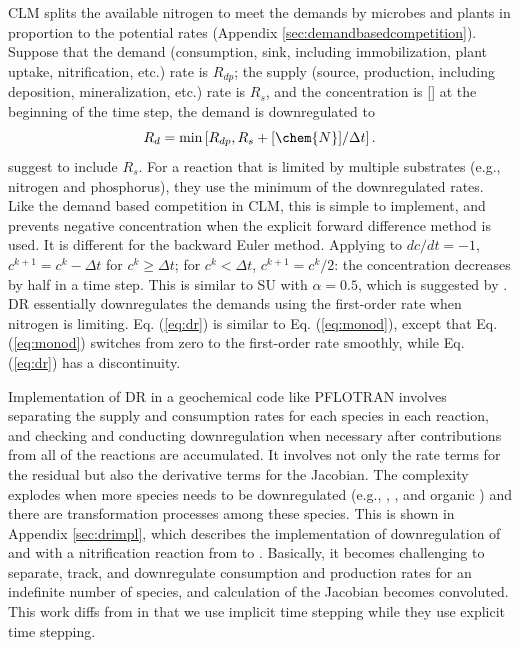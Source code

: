 \documentclass[gmd, manuscript]{copernicus}
\begin{document}
CLM splits the
available nitrogen to meet the demands by microbes and plants in
proportion to the potential rates \citep{Thornton2005,Oleson2013} (Appendix \ref{sec:demandbasedcompetition}). Suppose that the
demand (consumption, sink, including immobilization, plant uptake,
nitrification, etc.) rate is $R_{dp}$; the supply (source, production,
including deposition, mineralization, etc.) rate is $R_s$, and the
concentration is [] at the beginning of the time step, the demand is
downregulated to
\begin{equation}
R_d=\text{min}\left[R_{dp}, R_s + {[\chem{N}]}/{\Delta t}\right].	
\label{eq:dr}
\end{equation}
\citet{Tang2015}
suggest to include $R_s$. For a reaction that is limited by multiple substrates
(e.g., nitrogen and phosphorus), they use the minimum of the downregulated
rates. Like the demand based competition in CLM, this is simple to implement,
and prevents negative concentration when the explicit forward difference method
is used.  
It is different for the backward Euler method. 
Applying to $dc/dt=-1$, $c^{k+1}=c^k-\Delta t$ for $c^k \geq \Delta t$; for
$c^k < \Delta t$, $c^{k+1} = c^k/2$: the concentration decreases by half in a
time step. This is similar to SU with $\alpha=0.5$, which is suggested by
\citet{Bethke2007}. DR essentially downregulates the demands using the
first-order rate when nitrogen is limiting. Eq. (\ref{eq:dr}) is similar
to Eq. (\ref{eq:monod}), except that Eq. (\ref{eq:monod}) switches from zero to
the first-order rate smoothly, while Eq. (\ref{eq:dr}) has a discontinuity. 

Implementation of DR in a geochemical code like PFLOTRAN involves separating
the supply and consumption rates for each species in each reaction, and
checking and conducting downregulation when necessary after contributions from
all of the reactions are accumulated. It involves not only the rate terms for
the residual but also the derivative terms for the Jacobian. The complexity
explodes when more species needs to be downregulated (e.g., ,
, and organic ) and there are transformation processes
among these species. This is shown in Appendix \ref{sec:drimpl}, which describes the
implementation of downregulation of  and  with a
nitrification reaction from  to . Basically, it
becomes challenging to separate, track, and downregulate consumption and
production rates for an indefinite number of species, and calculation of the
Jacobian becomes convoluted. This work diffs from \citet{Tang2015} in
that we use implicit time stepping while they use explicit
time stepping.
\end{document}
